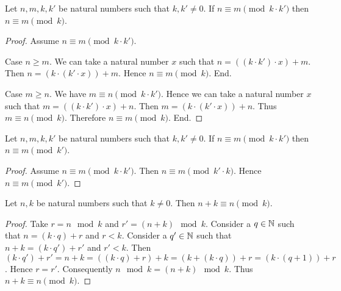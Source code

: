 \documentclass[10pt]{article}
\begin{document}
  \begin{forthel}
    \begin{proposition}
      Let $n, m, k, k'$ be natural numbers such that $k, k' \neq 0$.
      If $n \equiv m \pmod{k \cdot k'}$ then $n \equiv m \pmod{k}$.
    \end{proposition}
    \begin{proof}
      Assume $n \equiv m \pmod{k \cdot k'}$.

      Case $n \geq m$.
        We can take a natural number $x$ such that $n = ((k \cdot k') \cdot x) + m$.
        Then $n = (k \cdot (k' \cdot x)) + m$.
        Hence $n \equiv m \pmod{k}$.
      End.

      Case $m \geq n$.
        We have $m \equiv n \pmod{k \cdot k'}$.
        Hence we can take a natural number $x$ such that $m = ((k \cdot k') \cdot x) + n$.
        Then $m = (k \cdot (k' \cdot x)) + n$.
        Thus $m \equiv n \pmod{k}$.
        Therefore $n \equiv m \pmod{k}$.
      End.
    \end{proof}
  \end{forthel}

  \begin{forthel}
    \begin{corollary}
      Let $n, m, k, k'$ be natural numbers such that $k, k' \neq 0$.
      If $n \equiv m \pmod{k \cdot k'}$ then $n \equiv m \pmod{k'}$.
    \end{corollary}
    \begin{proof}
      Assume $n \equiv m \pmod{k \cdot k'}$.
      Then $n \equiv m \pmod{k' \cdot k}$.
      Hence $n \equiv m \pmod{k'}$.
    \end{proof}
  \end{forthel}

  \begin{forthel}
    \begin{proposition}
      Let $n, k$ be natural numbers such that $k \neq 0$.
      Then $n + k \equiv n \pmod{k}$.
    \end{proposition}
    \begin{proof}
      Take $r = n \mod k$ and $r' = (n + k) \mod k$.
      Consider a $q \in \mathbb{N}$ such that $n = (k \cdot q) + r$ and $r < k$.
      Consider a $q' \in \mathbb{N}$ such that $n + k = (k \cdot q') + r'$ and
      $r' < k$.
      Then $(k \cdot q') + r'
        = n + k
        = ((k \cdot q) + r) + k
        = (k + (k \cdot q)) + r
        = (k \cdot (q + 1)) + r$.
      Hence $r = r'$.
      Consequently $n \mod k = (n + k) \mod k$.
      Thus $n + k \equiv n \pmod{k}$.
    \end{proof}
  \end{forthel}
\end{document}
